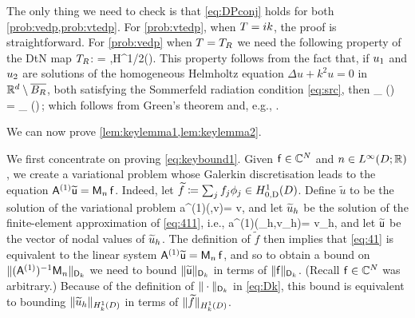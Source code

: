 The only thing we need to check is that \cref{eq:DPconj} holds for both \cref{prob:vedp,prob:vtedp}. For \cref{prob:vtedp}, when $T = ik$, the proof is straightforward. For \cref{prob:vedp} when $T = T_{R}$ we need the following property of the DtN map $T_{R}$:
\beq\label{eq:DtN}
\DPGR{\DtN\psi}{\phibar} = \DPGR{\DtN \phi}{\psibar} \quad\tfa \phi,\psi \in H^{1/2}(\GR).
\eeq
This property follows from the fact that, if $u_{1}$ and $u_{2}$ are solutions of the homogeneous Helmholtz equation $\Delta u +k^2 u=0$ in $\mathbb R^{d}\setminus \overline{B_{R}}$, both satisfying the Sommerfeld radiation condition \cref{eq:src}, then
\beqs
\int_{\GR} (\gamma \uo)\, \dn \utb = \int_{\GR} (\gamma \ut)\,\dn \uob;
\eeqs
which follows from Green's theorem and, e.g., \cite[Lemma 4.10]{Sp:15}.
\epf

We can now prove \cref{lem:keylemma1,lem:keylemma2}.

\label{page:lemkeylemma1proof}
We first concentrate on proving \cref{eq:keybound1}.
Given $\mathsf{f} \in \mathbb C^N$ and $n\in \LiDRR$, we create a variational problem whose Galerkin discretisation leads to the equation $\mathsf{A}^{(1)} \widetilde{\mathsf{u}} = \mathsf{M}_n\,\mathsf{f}$.
Indeed, let $\widetilde{f} \de \sum_j f_j \phi_j\in \HozDD$. Define $\widetilde{u}$ to be the solution of the variational problem 
\beq\label{eq:411}
a^{(1)}(,v)=  \quad{} v\in \HozDD,
\eeq
and let $\widetilde{u}_h$ be the solution of the finite-element approximation of \cref{eq:411}, i.e.,
\beq\label{eq:41}
a^{(1)}(\tu_h,v_h)=  \quad{} v_h\in \Vhp,
\eeq
and let $\widetilde{\mathsf{u}}$ be the vector of nodal values of $\widetilde{u}_h$. The definition of $\widetilde{f}$ then implies that \cref{eq:41} is equivalent to the linear system $\mathsf{A}^{(1)} \widetilde{\mathsf{u}} = \mathsf{M}_{n}\,\mathsf{f}$, and so to obtain a bound on $\|(\mathsf{A}^{(1)})^{-1}\mathsf{M}_n\|_{\mathsf{D}_k}$ we need to bound $\|\widetilde{\mathsf{u}}\|_{\mathsf{D}_k}$ in terms of $\|\mathsf{f}\|_{\mathsf{D}_k}$. (Recall $\mathsf{f} \in \mathbb C^{N}$ was arbitrary.) Because of the definition 
of $\|\cdot\|_{\mathsf{D}_k}$ in \cref{eq:Dk}, this bound is equivalent to bounding $\|\tu_h\|_{\HokD}$ in terms of $\|\widetilde{f}\|_{\HokD}$.


